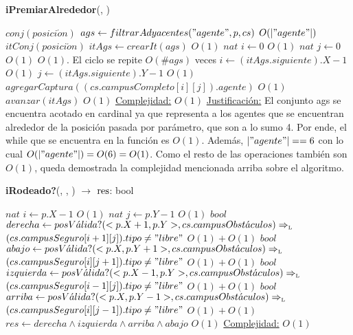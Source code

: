 \begin{Algoritmos}
\begin{algorithm}[H]{\textbf{iPremiarAlrededor}(, )}
	\begin{algorithmic} 
		\State $conj(posici\acute{o}n)$ $ags \gets filtrarAdyacentes("agente",p,cs)$	\Comment $O(|"agente"|)$
		\State $itConj(posici\acute{o}n)$ $itAgs \gets crearIt(ags)$	\Comment $O(1)$
        \State $nat$ $i \gets 0$	\Comment $O(1)$
        \State $nat$ $j \gets 0$	\Comment $O(1)$
			\Comment  $O(1)$. El ciclo se repite $O(\#ags)$ veces
			\State $i \gets (itAgs.siguiente).X-1$	\Comment $O(1)$
		    \State $j \gets (itAgs.siguiente).Y-1$ 	\Comment $O(1)$
		    \State $agregarCaptura((cs.campusCompleto[i][j]).agente)$	\Comment $O(1)$
		    \State $avanzar(itAgs)$	\Comment $O(1)$
		\EndWhile
        \medskip
		\Statex \underline{Complejidad:} $O(1)$
        \Statex \underline{Justificaci\'on:} El conjunto ags se encuentra acotado en cardinal ya que representa a los agentes que se encuentran alrededor de la posici\'on pasada por par\'ametro, que son a lo sumo 4. Por ende, el while que se encuentra en la funci\'on es $O(1)$. Adem\'as, $|"agente"| == 6$ con lo cual $O(|"agente"|) = O(6) = O(1)$. Como el resto de las operaciones tambi\'en son $O(1)$, queda demostrada la complejidad mencionada arriba sobre el algoritmo.
	\end{algorithmic}
\end{algorithm}


\begin{algorithm}[H]{\textbf{iRodeado?}(, , ) $\to$ $\res$: bool}
	\begin{algorithmic}
    	\State $nat$ $i \gets p.X-1$	\Comment $O(1)$
    	\State $nat$ $j \gets p.Y-1$	\Comment $O(1)$
        \State $bool$ $derecha \gets posV\acute{a}lida?(<p.X+1,p.Y>,cs.campusObst\acute{a}culos) \Rightarrow_{\mathrm{\scriptscriptstyle{L}}}$ \\ \hspace{65pt} $(cs.campusSeguro[i+1][j]).tipo \neq "libre"$	\Comment $O(1) + O(1)$
        \State $bool$ $abajo \gets posV\acute{a}lida?(<p.X,p.Y+1>,cs.campusObst\acute{a}culos) \Rightarrow_{\mathrm{\scriptscriptstyle{L}}}$ \\ \hspace{65pt} $(cs.campusSeguro[i][j+1]).tipo \neq "libre"$	\Comment $O(1) + O(1)$
        \State $bool$ $izquierda \gets posV\acute{a}lida?(<p.X-1,p.Y>,cs.campusObst\acute{a}culos) \Rightarrow_{\mathrm{\scriptscriptstyle{L}}}$ \\ \hspace{65pt} $(cs.campusSeguro[i-1][j]).tipo \neq "libre"$	\Comment $O(1) + O(1)$
        \State $bool$ $arriba \gets posV\acute{a}lida?(<p.X,p.Y-1>,cs.campusObst\acute{a}culos) \Rightarrow_{\mathrm{\scriptscriptstyle{L}}}$ \\ \hspace{65pt} $(cs.campusSeguro[i][j-1]).tipo \neq "libre"$	\Comment $O(1) + O(1)$
        \State $res \gets derecha \land izquierda \land arriba \land abajo$	\Comment $O(1)$
        \medskip
		\Statex \underline{Complejidad:} $O(1)$
	\end{algorithmic}
\end{algorithm}



\end{Algoritmos}
